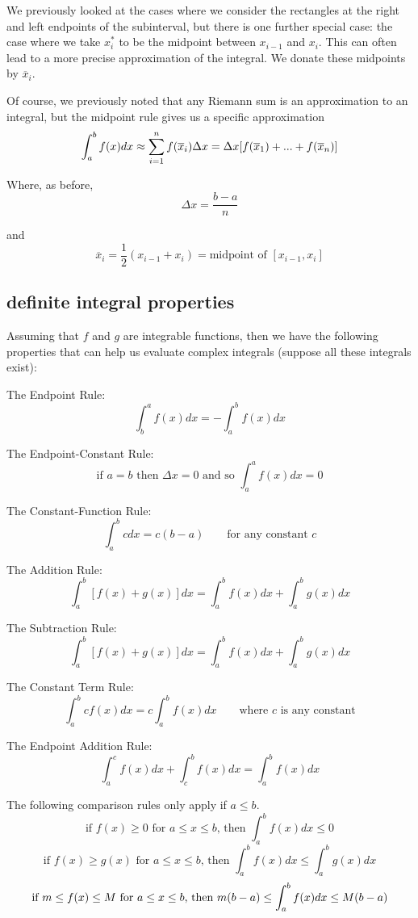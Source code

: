 \documentclass[10pt,a4paper]{report}
\begin{document}
We previously looked at the cases where we consider the rectangles at the right and left endpoints of the subinterval, but there is one further special case: the case where we take $x_i^*$ to be the midpoint between $x_{i-1}$ and $x_i$. This can often lead to a more precise approximation of the integral. We donate these midpoints by $\overline{x}_i$.

Of course, we previously noted that any Riemann sum is an approximation to an integral, but the midpoint rule gives us a specific approximation
$$
	\int_a^b f(x) dx \approx \displaystyle\sum_{i = 1}^n f(\overline{x}_i) \Delta x = \\
		\Delta x [ f(\overline{x}_1 ) + ... + f(\overline{x}_n) ]
$$

Where, as before,
$$
	\Delta x = \frac{b - a}{n}
$$

and
$$
	\overline{x}_i = \frac{1}{2} (x_{i - 1} + x_i) = \text{midpoint of } [x_{i - 1}, x_i]
$$

\pagebreak

\subsection{definite integral properties}


Assuming that $f$ and $g$ are integrable functions, then we have the following properties that can help us evaluate complex integrals (suppose all these integrals exist):

The Endpoint Rule:
$$
	\int_b^a f(x) dx = - \int_a^b f(x) dx
$$

The Endpoint-Constant Rule:
$$
	\text{if } a = b \text{ then } \Delta x = 0 \text{ and so } \int_a^a f(x) dx = 0
$$

The Constant-Function Rule:
$$
	\int_a^b c dx = c(b - a) \qquad \text{for any constant } c
$$

The Addition Rule:
$$
	\int_a^b [f(x) + g(x)] dx = \int_a^b f(x) dx + \int_a^b g(x) dx
$$

The Subtraction Rule:
$$
	\int_a^b [f(x) + g(x)] dx = \int_a^b f(x) dx + \int_a^b g(x) dx
$$

The Constant Term Rule:
$$
	\int_a^b cf(x) dx = c \int_a^b f(x)dx \qquad \text{where } c \text{ is any constant}
$$

The Endpoint Addition Rule:
$$
	\int_a^c f(x) dx + \int_c^b f(x) dx = \int_a^b f(x) dx
$$

\noindent The following comparison rules only apply if $a \leq b$.
$$
	\text{if } f(x) \geq 0 \text{ for } a \leq x \leq b \text{, then } \int_a^b f(x) dx \leq 0
$$
$$
	\text{if } f(x) \geq g(x) \text{ for } a \leq x \leq b \text{, then } \int_a^b f(x) dx \leq \int_a^b g(x) dx
$$
$$
	\text{if } m \leq f(x) \leq M \text{ for } a \leq x \leq b \text{, then } \\
	m(b - a) \leq \int_a^b f(x) dx \leq M(b - a)
$$
\end{document}
